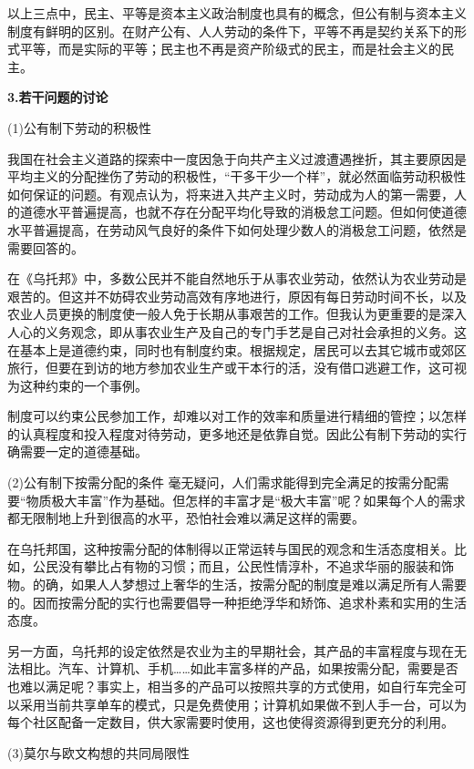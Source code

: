 \par 以上三点中，民主、平等是资本主义政治制度也具有的概念，但公有制与资本主义制度有鲜明的区别。在财产公有、人人劳动的条件下，平等不再是契约关系下的形式平等，而是实际的平等；民主也不再是资产阶级式的民主，而是社会主义的民主。

\par \textbf{3.若干问题的讨论}
\par (1)公有制下劳动的积极性
\par 我国在社会主义道路的探索中一度因急于向共产主义过渡遭遇挫折，其主要原因是平均主义的分配挫伤了劳动的积极性，“干多干少一个样”，就必然面临劳动积极性如何保证的问题。有观点认为，将来进入共产主义时，劳动成为人的第一需要，人的道德水平普遍提高，也就不存在分配平均化导致的消极怠工问题。但如何使道德水平普遍提高，在劳动风气良好的条件下如何处理少数人的消极怠工问题，依然是需要回答的。
\par 在《乌托邦》中，多数公民并不能自然地乐于从事农业劳动，依然认为农业劳动是艰苦的。但这并不妨碍农业劳动高效有序地进行，原因有每日劳动时间不长，以及农业人员更换的制度使一般人免于长期从事艰苦的工作。但我认为更重要的是深入人心的义务观念，即从事农业生产及自己的专门手艺是自己对社会承担的义务。这在基本上是道德约束，同时也有制度约束。根据规定，居民可以去其它城市或郊区旅行，但要在到访的地方参加农业生产或干本行的活，没有借口逃避工作，这可视为这种约束的一个事例。
\par 制度可以约束公民参加工作，却难以对工作的效率和质量进行精细的管控；以怎样的认真程度和投入程度对待劳动，更多地还是依靠自觉。因此公有制下劳动的实行确需要一定的道德基础。
\par (2)公有制下按需分配的条件
毫无疑问，人们需求能得到完全满足的按需分配需要“物质极大丰富”作为基础。但怎样的丰富才是“极大丰富”呢？如果每个人的需求都无限制地上升到很高的水平，恐怕社会难以满足这样的需要。
\par 在乌托邦国，这种按需分配的体制得以正常运转与国民的观念和生活态度相关。比如，公民没有攀比占有物的习惯；而且，公民性情淳朴，不追求华丽的服装和饰物。的确，如果人人梦想过上奢华的生活，按需分配的制度是难以满足所有人需要的。因而按需分配的实行也需要倡导一种拒绝浮华和矫饰、追求朴素和实用的生活态度。
\par 另一方面，乌托邦的设定依然是农业为主的早期社会，其产品的丰富程度与现在无法相比。汽车、计算机、手机……如此丰富多样的产品，如果按需分配，需要是否也难以满足呢？事实上，相当多的产品可以按照共享的方式使用，如自行车完全可以采用当前共享单车的模式，只是免费使用；计算机如果做不到人手一台，可以为每个社区配备一定数目，供大家需要时使用，这也使得资源得到更充分的利用。
\par (3)莫尔与欧文构想的共同局限性
